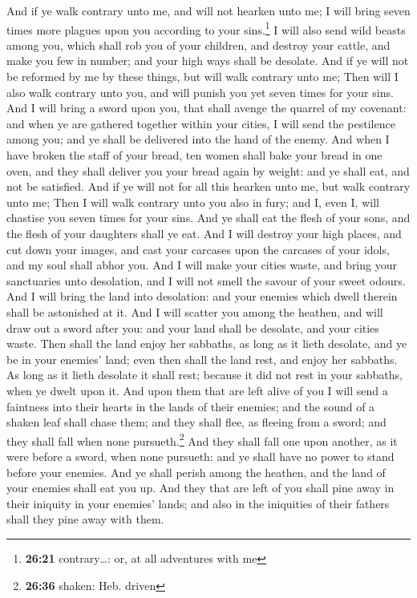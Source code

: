  And if ye walk contrary unto me, and will not hearken
unto me; I will bring seven times more plagues upon you according to
your sins.\footnote{\textbf{26:21} contrary\ldots: or, at all adventures
  with me}  I will also send wild beasts among you, which
shall rob you of your children, and destroy your cattle, and make you
few in number; and your high ways shall be desolate.  And
if ye will not be reformed by me by these things, but will walk contrary
unto me;  Then will I also walk contrary unto you, and
will punish you yet seven times for your sins.  And I
will bring a sword upon you, that shall avenge the quarrel of my
covenant: and when ye are gathered together within your cities, I will
send the pestilence among you; and ye shall be delivered into the hand
of the enemy.  And when I have broken the staff of your
bread, ten women shall bake your bread in one oven, and they shall
deliver you your bread again by weight: and ye shall eat, and not be
satisfied.  And if ye will not for all this hearken unto
me, but walk contrary unto me;  Then I will walk contrary
unto you also in fury; and I, even I, will chastise you seven times for
your sins.  And ye shall eat the flesh of your sons, and
the flesh of your daughters shall ye eat.  And I will
destroy your high places, and cut down your images, and cast your
carcases upon the carcases of your idols, and my soul shall abhor you.
 And I will make your cities waste, and bring your
sanctuaries unto desolation, and I will not smell the savour of your
sweet odours.  And I will bring the land into desolation:
and your enemies which dwell therein shall be astonished at it.
 And I will scatter you among the heathen, and will draw
out a sword after you: and your land shall be desolate, and your cities
waste.  Then shall the land enjoy her sabbaths, as long
as it lieth desolate, and ye be in your enemies' land; even then shall
the land rest, and enjoy her sabbaths.  As long as it
lieth desolate it shall rest; because it did not rest in your sabbaths,
when ye dwelt upon it.  And upon them that are left alive
of you I will send a faintness into their hearts in the lands of their
enemies; and the sound of a shaken leaf shall chase them; and they shall
flee, as fleeing from a sword; and they shall fall when none
pursueth.\footnote{\textbf{26:36} shaken: Heb. driven} 
And they shall fall one upon another, as it were before a sword, when
none pursueth: and ye shall have no power to stand before your enemies.
 And ye shall perish among the heathen, and the land of
your enemies shall eat you up.  And they that are left of
you shall pine away in their iniquity in your enemies' lands; and also
in the iniquities of their fathers shall they pine away with them.

